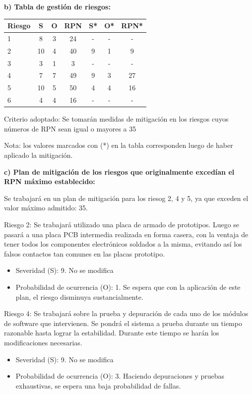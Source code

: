 \documentclass[11pt]{charter}
\begin{document}
\textbf{b) Tabla de gestión de riesgos:}

\begin{table}[htpb]
\centering
\begin{tabularx}{\linewidth}{@{}|X|c|c|c|c|c|c|@{}}
\hline
\rowcolor[HTML]{C0C0C0} 
Riesgo & S & O & RPN & S* & O* & RPN* \\ \hline
1 & 8  & 3  &  \cellcolor[HTML]{7ab560}24   &   - &  -  &    -  \\ \hline
2 &  10 &  4 & \cellcolor[HTML]{c94848} 40  &  9  &  1  &  \cellcolor[HTML]{7ab560}9 \\ \hline
3 &  3 & 1  &   \cellcolor[HTML]{7ab560}3  &  -  &  -  &    -  \\ \hline
4 & 7  & 7  &  \cellcolor[HTML]{c94848}49   &  9  & 3   & \cellcolor[HTML]{7ab560}27  \\ \hline
5 &  10 &  5 &  \cellcolor[HTML]{c94848}50   &  4  & 4   & \cellcolor[HTML]{7ab560}16  \\ \hline
6 & 4  & 4  &   \cellcolor[HTML]{7ab560}16  &  -  &  - &   - \\ \hline
\end{tabularx}%
\end{table}

Criterio adoptado: 
Se tomarán medidas de mitigación en los riesgos cuyos números de RPN sean igual o mayores a 35

Nota: los valores marcados con (*) en la tabla corresponden luego de haber aplicado la mitigación.

\textbf{c) Plan de mitigación de los riesgos que originalmente excedían el RPN máximo establecido:}
 
 Se trabajará en un plan de mitigación para los riesog 2, 4 y 5, ya que exceden el valor máximo admitido: 35.
 
Riesgo 2: Se trabajará utilizado una placa de armado de prototipos. Luego se pasará a una placa PCB intermedia realizada en forma casera, con la ventaja de tener todos los componentes electrónicos soldados a la misma, evitando así los falsos contactos tan comunes en las placas prototipo.
\begin{itemize}
\item Severidad (S): 9. No se modifica
\item Probabilidad de ocurrencia (O): 1. Se espera que con la aplicación de este plan, el riesgo disminuya sustancialmente.
\end{itemize}

Riesgo 4: Se trabajará sobre la prueba y depuración de cada uno de los módulos de software que intervienen. Se pondrá el sistema a prueba durante un tiempo razonable hasta lograr la estabilidad. Durante este tiempo se harán los modificaciones necesarias.
\begin{itemize}
\item Severidad (S): 9. No se modifica
\item Probabilidad de ocurrencia (O): 3. Haciendo depuraciones y pruebas exhaustivas, se espera una baja probabilidad de fallas.
\end{itemize}
\end{document}
